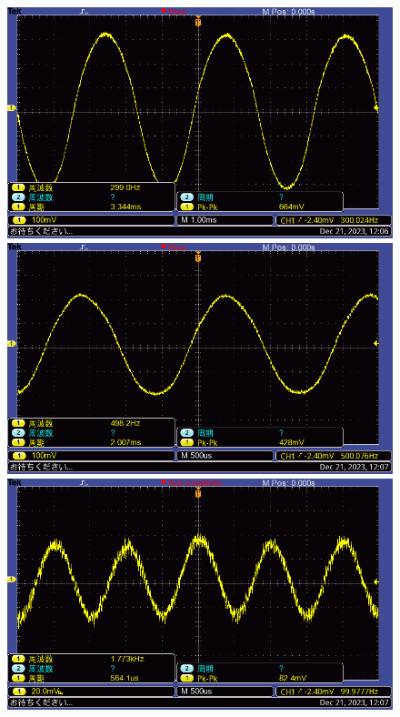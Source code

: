 \documentclass{ltjsarticle}
\begin{document}
\begin{figure}[H]
\begin{minipage}{0.4\columnwidth}
			\end{minipage}
			\hspace{0.04\columnwidth}
			\begin{minipage}{0.4\columnwidth}
			\centering
			\includegraphics[width = \columnwidth]{figs/F0008TEK.PNG}
			\end{minipage}
			\hspace{0.04\columnwidth}
			\begin{minipage}{0.4\columnwidth}
			\centering
			\includegraphics[width = \columnwidth]{figs/F0009TEK.PNG}
			\end{minipage}
			\hspace{0.04\columnwidth}
			\begin{minipage}{0.4\columnwidth}
			\centering
			\includegraphics[width = \columnwidth]{figs/F0010TEK.PNG}

\end{minipage}
\end{figure}
\end{document}
